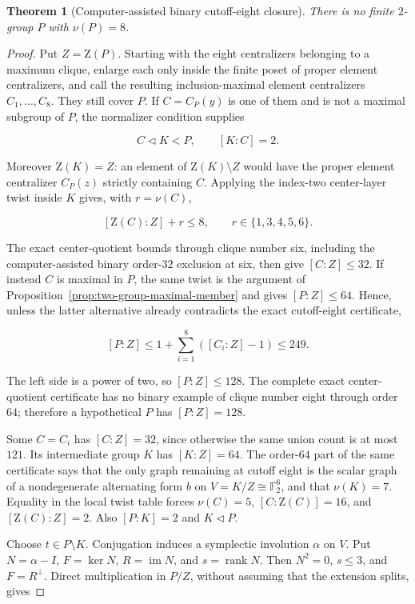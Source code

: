 \documentclass[11pt]{article}
\newtheorem{theorem}{Theorem}[section]
\theoremstyle{remark}
\newcommand{\nuG}{\nu}
\newcommand{\F}{\mathbb F}
\newcommand{\Z}{\mathrm Z}
\begin{document}
\begin{theorem}[Computer-assisted binary cutoff-eight closure]
\label{thm:two-group-cutoff-eight-closure}
There is no finite $2$-group $P$ with $\nuG(P)=8$.
\end{theorem}

\begin{proof}
Put $Z=\Z(P)$.  Starting with the eight centralizers belonging to a
maximum clique, enlarge each only inside the finite poset of proper element
centralizers, and call the resulting inclusion-maximal element centralizers
$C_1,\ldots,C_8$.  They still cover $P$.  If $C=C_P(y)$ is one of them and
is not a maximal subgroup of $P$, the normalizer condition supplies

\[
 C\mathrel{\triangleleft}K<P,\qquad [K:C]=2.
\]

Moreover $\Z(K)=Z$: an element of $\Z(K)\setminus Z$ would have the proper
element centralizer $C_P(z)$ strictly containing $C$.  Applying the
index-two center-layer twist inside $K$ gives, with $r=\nuG(C)$,

\[
 [\Z(C):Z]+r\le8,
 \qquad r\in\{1,3,4,5,6\}.
\]

The exact center-quotient bounds through clique number six, including the
computer-assisted binary order-$32$ exclusion at six, then give
$[C:Z]\le32$.  If instead $C$ is maximal in $P$, the same twist is the
argument of Proposition~\ref{prop:two-group-maximal-member} and gives
$[P:Z]\le64$.  Hence, unless the latter alternative already contradicts
the exact cutoff-eight certificate,

\[
 [P:Z]\le 1+\sum_{i=1}^8([C_i:Z]-1)\le249.
\]

The left side is a power of two, so $[P:Z]\le128$.  The complete exact
center-quotient certificate has no binary example of clique number eight
through order $64$; therefore a hypothetical $P$ has $[P:Z]=128$.

Some $C=C_i$ has $[C:Z]=32$, since otherwise the same union count is at
most $121$.  Its intermediate group $K$ has $[K:Z]=64$.  The order-$64$
part of the same certificate says that the only graph remaining at cutoff
eight is the scalar graph of a nondegenerate alternating form
$b$ on $V=K/Z\cong\F_2^6$, and that $\nuG(K)=7$.  Equality in the local
twist table forces $\nuG(C)=5$, $[C:\Z(C)]=16$, and
$[\Z(C):Z]=2$.  Also $[P:K]=2$ and $K\triangleleft P$.

Choose $t\in P\setminus K$.  Conjugation induces a symplectic involution
$\alpha$ on $V$.  Put $N=\alpha-I$, $F=\ker N$, $R=\operatorname{im}N$,
and $s=\operatorname{rank}N$.  Then $N^2=0$, $s\le3$, and
$F=R^\perp$.  Direct multiplication in $P/Z$, without assuming that the
extension splits, gives


\end{proof}
\end{document}
